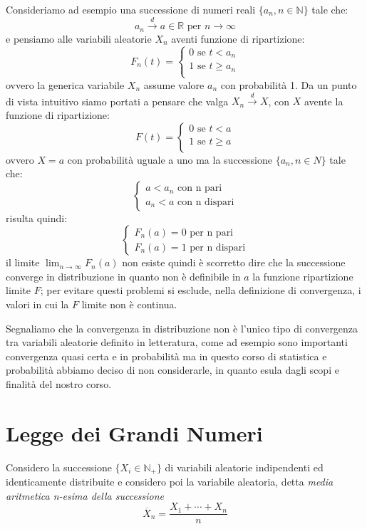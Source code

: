 \documentclass[a4paper,12pt, oneside]{book}
\newcommand{\numberset}{\mathbb}
\newcommand{\N}{\numberset{N}}
\newcommand{\R}{\numberset{R}}
\begin{document}
Consideriamo ad esempio una successione di numeri reali $\{a_n, n \in \N\}$ tale che:
\[a_n \stackrel{d}{\longrightarrow} a \in \R \mbox{ per } n \to \infty\]
e pensiamo alle variabili aleatorie $X_n$ aventi funzione di ripartizione:
\[F_n(t) = \begin{cases}
            0 \mbox{ se } t < a_n\\
            1 \mbox{ se } t \geq a_n\\
           \end{cases}\]
ovvero la generica variabile $X_n$ assume valore $a_n$ con probabilità 1.\newline
Da un punto di vista intuitivo siamo portati a pensare che valga $X_n \stackrel{d}{\longrightarrow} X$,
con $X$ avente la funzione di ripartizione:
\[ F(t) = \begin{cases}
            0 \mbox{ se } t < a\\
            1 \mbox{ se } t \geq a\\
          \end{cases}\]
ovvero $X = a$ con probabilità uguale a uno ma la successione $\{a_n, n \in N\}$ tale che:
\[\begin{cases}
        a<a_n\mbox{ con n pari}\\
        a_n<a\mbox{ con n dispari}
  \end{cases}\]
risulta quindi:
\[\begin{cases}
    F_n(a) = 0 \mbox{ per n pari}\\
    F_n(a) = 1 \mbox{ per n dispari}
\end{cases}\]
il limite $\lim_{n \to \infty} F_n(a)$ non esiste quindi è scorretto dire che la successione converge
in distribuzione in quanto non è definibile in $a$ la funzione ripartizione limite $F$;
per evitare questi problemi si esclude, nella definizione di convergenza, i valori in cui la $F$ limite non è continua.

Segnaliamo che la convergenza in distribuzione non è l’unico tipo di convergenza tra variabili aleatorie
definito in letteratura, come ad esempio sono importanti convergenza quasi certa e in probabilità ma
in questo corso di statistica e probabilità abbiamo deciso di non considerarle, in quanto esula dagli scopi
e finalità del nostro corso.

\section{Legge dei Grandi Numeri}
Considero la successione $\{X_i \in \N_+\}$ di variabili aleatorie indipendenti ed identicamente distribuite e
considero poi la variabile aleatoria, detta \emph{media aritmetica n-esima della successione}
\[ \overline{X}_n = \frac{X_1 + \cdots + X_n}{n}\]
\end{document}
